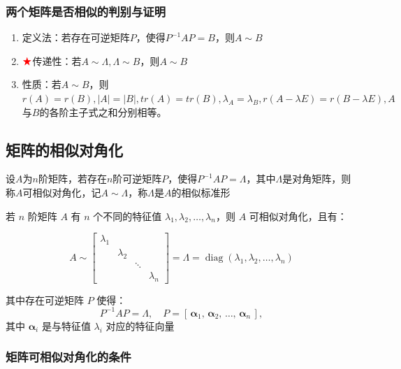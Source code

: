 \documentclass[./linear_algebra.tex]{subfiles}
\begin{document}
    \subsubsection{两个矩阵是否相似的判别与证明}

    \begin{enumerate}
        \item 定义法：若存在可逆矩阵$P$，使得$P^{-1}AP = B$，则$A\sim B$
        \item $\color{red}{\bigstar}$传递性：若$A\sim \Lambda, \Lambda\sim B$，则$A\sim B$
        \item 性质：若$A\sim B$，则$r(A) = r(B), |A| = |B|, tr(A) = tr(B), \lambda_A = \lambda_B, r(A - \lambda E) = r(B - \lambda E), A$与$B$的各阶主子式之和分别相等。{\color{red}{满足性质不一定相似，但不满足性质一定不相似}}
    \end{enumerate}

    \subsection{矩阵的相似对角化}

    设$A$为$n$阶矩阵，若存在$n$阶可逆矩阵$P$，使得$P^{-1}AP = \Lambda$，其中$\Lambda$是对角矩阵，则称$A$可相似对角化，记$A\sim \Lambda$，称$\Lambda$是$A$的相似标准形

    \noindent
    若 $n$ 阶矩阵 $A$ 有 $n$ 个不同的特征值 $\lambda_1, \lambda_2, \dots, \lambda_n$，则 $A$ 可相似对角化，且有：

    \[
        A \sim
        \begin{bmatrix}
            \lambda_1 &           &        &           \\
            & \lambda_2 &        &           \\
            &           & \ddots &           \\
            &           &        & \lambda_n
        \end{bmatrix}
        = \Lambda = \operatorname{diag}(\lambda_1,\lambda_2,\ldots,\lambda_n)
    \]

    其中存在可逆矩阵 $P$ 使得：
    \[
        P^{-1} A P = \Lambda, \quad
        P = [\,\bm{\alpha}_1,\, \bm{\alpha}_2,\, \dots,\, \bm{\alpha}_n\,],
    \]
    其中 $\bm{\alpha}_i$ 是与特征值 $\lambda_i$ 对应的特征向量

    \subsubsection{矩阵可相似对角化的条件}
\end{document}

